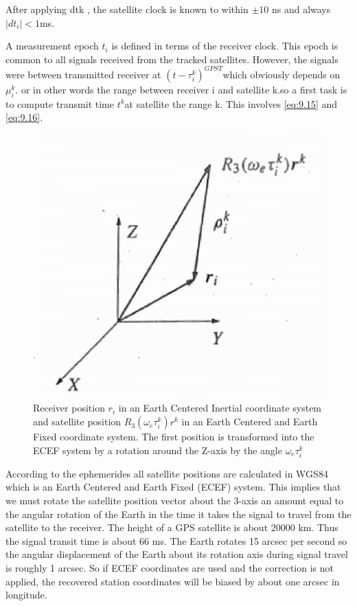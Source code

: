	After applying dtk , the satellite clock is known to within $\pm 10$ ns and always $|dt_i|<1$ms.
	
	A measurement epoch $t_i$ is defined in terms of the receiver clock. This epoch is common to all signals received from the tracked satellites. However, the signals were between transmitted receiver at $(t-\tau ^k_i)^{GPST}$which obviously depends on $\mu ^k_i$. or in other words the range between receiver i and satellite k.so a first task is to compute transmit time $t^k$at satellite the range k. This involves \ref{eq:9.15} and \ref{eq:9.16}.
	\begin{figure}
	\centering
	\includegraphics[width=0.7\linewidth]{TeX_files/Part03/chapter09/image/9-12}
	\caption{Receiver position $r_i$ in an Earth Centered Inertial coordinate system and satellite position $R_3(\omega_e \tau ^k_i)r^k$ in an Earth Centered and Earth Fixed coordinate system. The first position is transformed into the ECEF system by a rotation around the Z-axis by the angle $\omega_e \tau ^k_i$}
	\label{fig:9-12}
	\end{figure}

	According to the ephemerides all satellite positions are calculated in WGS84 which is an Earth Centered and Earth Fixed (ECEF) system. This implies that we must rotate the satellite position vector about the 3-axis an amount equal to the angular rotation of the Earth in the time it takes the signal to travel from the satellite to the receiver. The height of a GPS satellite is about 20000 km. Thus the signal transit time is about 66 ms. The Earth rotates 15 arcsec per second so the angular displacement of the Earth about its rotation axis during signal travel is roughly 1 arcsec. So if ECEF coordinates are used and the correction is not applied, the recovered station coordinates will be biased by about one arcsec in longitude.
	
